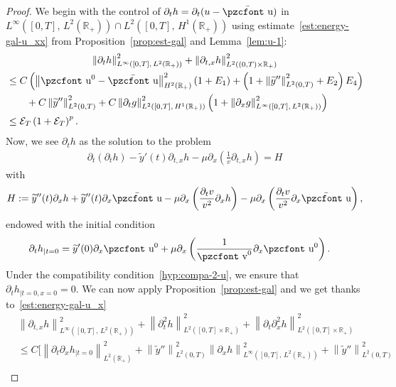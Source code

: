 \documentclass[10pt]{amsart}
\theoremstyle{definition}\newtheorem{defi}[theo]{Definition}\newtheorem{rema}[theo]{Remark}\newtheorem{exam}[theo]{Example}\newtheorem{exem}[theo]{Example}\newtheorem{nota}[theo]{Notation}
\newcommand{\mathpzc}[1]{\text{\pzcfont #1}}
\newcommand{\R}{\mathbb{R}}
\newcommand{\p}{\partial}
\newcommand{\bu}{\bar{\mathpzc{u}}}
\newcommand{\cE}{\mathcal E}
\newcommand{\tv}{\mathpzc{v}}
\newcommand{\tu}{\mathpzc{u}}
\newcommand{\ty}{\widetilde{y}}
\begin{document}
\begin{proof}
We begin with the control of $\p_t h=\partial_t (u-\bu)$ in $L^\infty([0,T],\,L^2(\R_+)) \cap L^2([0,T],\,H^1(\R_+))$ using estimate~\eqref{est:energy-gal-u_xx} from Proposition~\ref{prop:est-gal} and Lemma~\ref{lem:u-1}:
\begin{multline}\label{eq:est-dtu-1}
\left\|\partial_th\right\|_{L^\infty\left([0,T],\,L^2(\R_+)\right)}^2 + \left\|\partial_{t,x}h\right\|_{L^2\left((0,T)\times \R_+\right)}^2\\
\begin{aligned}
& \leq C \left(\left\|\tu^0-\bu\right\|_{H^2(\R_+)}^2 (1+E_1) + \left(1+ \left\|\ty''\right\|_{L^2(0,T)}^2 + E_2\right) E_4\right)\\
&\qquad + C \left\|\ty''\right\|_{L^2(0,T)}^2 + C \left\|\p_t g\right\|_{L^2\left([0,T],\,H^1(\R_+)\right)}^2 \left(1 + \left\|\p_x g\right\|_{L^\infty\left([0,T],\,L^2(\R_+)\right)}^2\right) \\
&\leq \cE_T\left(1 + \cE_T\right)^{p}.
\end{aligned}
\end{multline}
Now, we see $\partial_th$ as the solution to the problem
\begin{align}
\partial_t (\partial_th) -\ty'(t) \partial_{t,x}h - \mu \partial_x \left(\frac{1}{v}\partial_{t,x}h\right) = H
\end{align}
with
\begin{align*}
H := \ty''(t)\partial_xh +\ty''(t)\partial_x \bu- \mu \partial_x\left(\frac{\partial_t v}{v^2} \partial_xh \right) - \mu \partial_x\left(\frac{\partial_t v}{v^2} \partial_x \bu \right),
\end{align*}
endowed with the initial condition
\begin{align*}
\partial_th_{|t=0} & = \ty'(0) \partial_x \tu^0 + \mu \partial_x\left(\frac{1}{\tv^0} \partial_x\tu^0 \right).
\end{align*}
Under the compatibility condition~\eqref{hyp:compa-2-u}, we ensure that $\partial_th_{|t=0, x=0} = 0$. We can now apply Proposition~\ref{prop:est-gal} and we get thanks to~\eqref{est:energy-gal-u_x}
\begingroup
\allowdisplaybreaks
\begin{align*}
&\left\|\partial_{t,x}h\right\|_{L^\infty\left([0,T],\,L^2(\R_+)\right)}^2 + \left\|\partial^2_th\right\|_{L^2\left([0,T]\times \R_+\right)}^2 + \left\|\partial_t \partial^2_xh\right\|_{L^2\left([0,T]\times \R_+\right)}^2 \\
& \leq C \Bigg[\left\|\partial_t \partial_xh_{|t=0}\right\|_{L^2(\R_+)}^2 + \left\|\ty''\right\|_{L^2(0,T)}^2\left\|\p_xh\right\|_{L^\infty\left([0,T],\,L^2(\R_+)\right)}^2 + \left\|\ty''\right\|_{L^2(0,T)}^2\\

\end{align*}
\end{proof}
\end{document}
